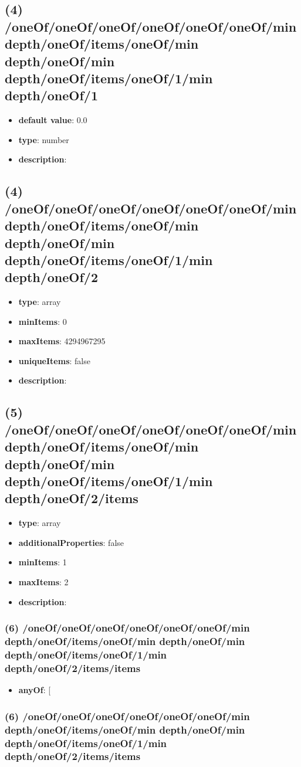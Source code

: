 \subsection{(4) /oneOf/oneOf/oneOf/oneOf/oneOf/oneOf/min depth/oneOf/items/oneOf/min depth/oneOf/min depth/oneOf/items/oneOf/1/min depth/oneOf/1}
\begin{itemize}[leftmargin=4em]\item {\bf default value}: 0.0
\item {\bf type}: number
\item {\bf description}: 
\end{itemize}\subsection{(4) /oneOf/oneOf/oneOf/oneOf/oneOf/oneOf/min depth/oneOf/items/oneOf/min depth/oneOf/min depth/oneOf/items/oneOf/1/min depth/oneOf/2}
\begin{itemize}[leftmargin=4em]\item {\bf type}: array
\item {\bf minItems}: 0
\item {\bf maxItems}: 4294967295
\item {\bf uniqueItems}: false
\item {\bf description}: 
\end{itemize}\subsection{(5) /oneOf/oneOf/oneOf/oneOf/oneOf/oneOf/min depth/oneOf/items/oneOf/min depth/oneOf/min depth/oneOf/items/oneOf/1/min depth/oneOf/2/items}
\begin{itemize}[leftmargin=5em]\item {\bf type}: array
\item {\bf additionalProperties}: false
\item {\bf minItems}: 1
\item {\bf maxItems}: 2
\item {\bf description}: 
\end{itemize}\subsubsection{(6) /oneOf/oneOf/oneOf/oneOf/oneOf/oneOf/min depth/oneOf/items/oneOf/min depth/oneOf/min depth/oneOf/items/oneOf/1/min depth/oneOf/2/items/items}
\begin{itemize}[leftmargin=6em]\item {\bf anyOf}: [\end{itemize}\subsubsection{(6) /oneOf/oneOf/oneOf/oneOf/oneOf/oneOf/min depth/oneOf/items/oneOf/min depth/oneOf/min depth/oneOf/items/oneOf/1/min depth/oneOf/2/items/items}
